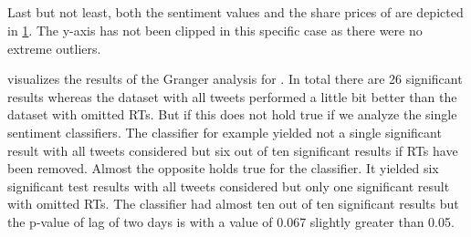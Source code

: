 \subsection{\vw}
\label{ss:analysis-granger-vw}

Last but not least, both the sentiment values and the share prices of \vw{} are depicted in \cref{fig:analysis-results-vw}.
The y-axis has not been clipped in this specific case as there were no extreme outliers.

\begin{figure}[hbt]
    \centering
    
    \caption{\resultsCaption{\vw}}
    \label{fig:analysis-results-vw}
\end{figure} 


 visualizes the results of the Granger analysis for \vw{}.
In total there are 26 significant results whereas the dataset with all tweets performed a little bit better than the dataset with omitted \acp{RT}.
But if this does not hold true if we analyze the single sentiment classifiers.
The classifier \tb{} for example yielded not a single significant result with all tweets considered but six out of ten significant results if \acp{RT} have been removed.
Almost the opposite holds true for the \nb{} classifier.
It yielded six significant test results with all tweets considered but only one significant result with omitted \acp{RT}.
The \svm{} classifier had almost ten out of ten significant results but the p-value of lag of two days is with a value of 0.067 slightly greater than 0.05.

